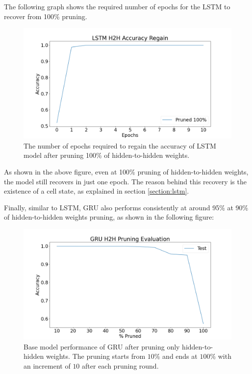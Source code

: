 The following graph shows the required number of epochs for the LSTM to recover from 100\% pruning.

\begin{figure}[h]
	\centering
	\includegraphics[width=0.8\linewidth]{images/results/pruning_h2h/lstm_h2h_accuracy_regain.png}
	\caption[LSTM base model performance regain after pruning h2h weights]%
	{The number of epochs required to regain the accuracy of LSTM model after pruning 100\% of hidden-to-hidden weights.}
	\label{fig:lstm_h2h_prune_regain}
\end{figure}

As shown in the above figure, even at 100\% pruning of hidden-to-hidden weights, the model still recovers in just one epoch. The reason behind this recovery is the existence of a cell state, as explained in section \ref{section:lstm}.

Finally, similar to LSTM, GRU also performs consistently at around 95\% at 90\% of hidden-to-hidden weights pruning, as shown in the following figure:

\begin{figure}[h]
	\centering
	\includegraphics[width=0.8\linewidth]{images/results/pruning_h2h/gru_h2h_pruning_evaluation.png}
	\caption[GRU base model performance after pruning h2h weights]%
	{Base model performance of GRU after pruning only hidden-to-hidden weights. The pruning starts from $10\%$ and ends at $100\%$ with an increment of $10$ after each pruning round.}
	\label{fig:gru_h2h_prune}
\end{figure}

